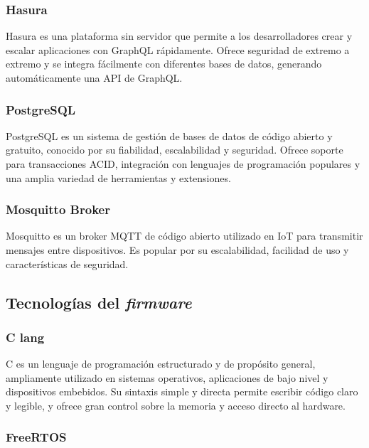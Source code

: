 \subsubsection{Hasura}

Hasura \citep{hasura} es una plataforma sin servidor que permite a los desarrolladores crear y escalar aplicaciones con GraphQL rápidamente. Ofrece seguridad de extremo a extremo y se integra fácilmente con diferentes bases de datos, generando automáticamente una API de GraphQL.


\subsubsection{PostgreSQL}

PostgreSQL \citep{postgresql} es un sistema de gestión de bases de datos de código abierto y gratuito, conocido por su fiabilidad, escalabilidad y seguridad. Ofrece soporte para transacciones ACID, integración con lenguajes de programación populares y una amplia variedad de herramientas y extensiones.


\subsubsection{Mosquitto Broker}

Mosquitto \citep{mosquitto} es un broker MQTT de código abierto utilizado en IoT para transmitir mensajes entre dispositivos. Es popular por su escalabilidad, facilidad de uso y características de seguridad.


\subsection{Tecnologías del \textit{firmware}}


\subsubsection{C lang}

C \citep{c-lang} es un lenguaje de programación estructurado y de propósito general, ampliamente utilizado en sistemas operativos, aplicaciones de bajo nivel y dispositivos embebidos. Su sintaxis simple y directa permite escribir código claro y legible, y ofrece gran control sobre la memoria y acceso directo al hardware.


\subsubsection{FreeRTOS}

